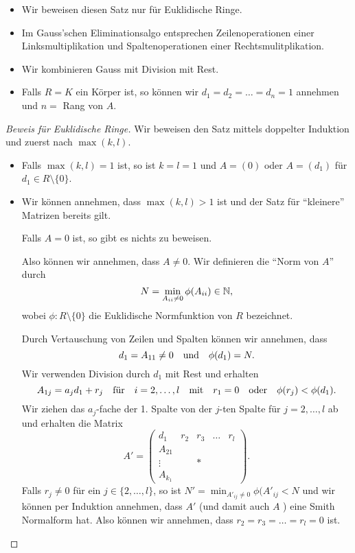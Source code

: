 \begin{itemize}
	\item Wir beweisen diesen Satz nur für Euklidische Ringe.
	\item Im Gauss'schen Eliminationsalgo entsprechen Zeilenoperationen einer Linksmultiplikation und Spaltenoperationen einer Rechtsmulitplikation.
	\item Wir kombinieren Gauss mit Division mit Rest.
	\item Falls $R = K$ ein Körper ist, so können wir $d_1 = d_2 = \ldots = d_{n} = 1$ annehmen und $n = $ Rang von  $A$.
\end{itemize}

\begin{proof}[Beweis für Euklidische Ringe]
	Wir beweisen den Satz mittels doppelter Induktion und zuerst nach $\max(k,l)$.
	\begin{itemize}
		\item Falls $\max(k,l) = 1$ ist, so ist $k=l=1$ und $A = (0)$ oder $A = (d_1)$ für $d_1 \in R \setminus \{0\} $.
		\item Wir können annehmen, dass $\max(k,l) > 1$ ist und der Satz für \enquote{kleinere} Matrizen bereits gilt.

			Falls $A = 0$ ist, so gibt es nichts zu beweisen.

			Also können wir annehmen, dass $A \neq 0$. Wir definieren die \enquote{Norm von $A$} durch 
			\[
				N = \min_{A_{ii} \neq 0} \phi(A_{ii}) \in \mathbb{N},
			\] 
			wobei $\phi: R \setminus \{0\} $ die Euklidische Normfunktion von $R$ bezeichnet.

			Durch Vertauschung von Zeilen und Spalten können wir annehmen, dass 
			\[
				d_1 = A_{11} \neq 0 \qq{und} \phi(d_1) = N
			.\] 
			Wir verwenden Division durch $d_1$ mit Rest und erhalten
			\[
				A_{1 j} = a_{j} d_1 + r_{j} \qq{für} i = 2,\ldots,l \qq{mit} r_1 = 0 \qq{oder} \phi(r_{j}) < \phi(d_1)
			.\] 
			Wir ziehen das $a_{j}$-fache der 1. Spalte von der $j$-ten Spalte für $j=2,\ldots,l$ ab und erhalten die Matrix
			\[
			A' = \begin{pmatrix} 
				d_1 &r_2 &r_3 &\ldots &r_{l}\\
				A_{21}\\
				\vdots & &*\\
				A_{k_1}
			\end{pmatrix} 
			.\]
			Falls $r_{j} \neq 0$ für ein $j \in \{2, \ldots, l\} $, so ist $N' = \min_{A'_{ij}\neq 0} \phi(A'_{ij} < N$ und wir
			können per Induktion annehmen, dass $A'$ (und damit auch $A$ ) eine Smith Normalform hat.
			Also können wir annehmen, dass $r_2 = r_3 = \ldots = r_{l} = 0$ ist.
			

\end{itemize}
\end{proof}
